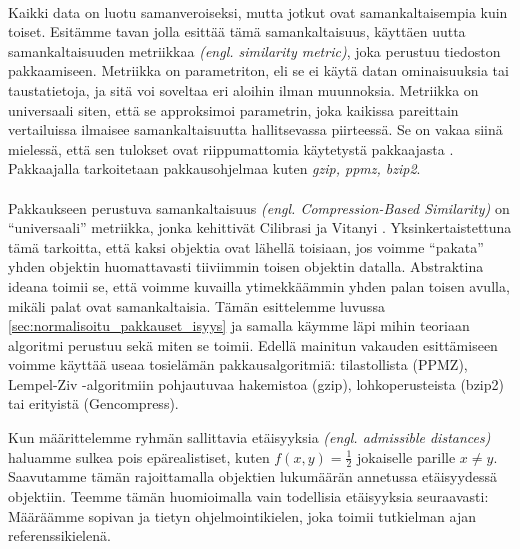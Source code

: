 \documentclass[11pt,finnish]{tktltiki2}
\theoremstyle{definition}
\theoremstyle{remark}
\newcommand{\engl}[1]{\emph{(engl. #1)}}
\begin{document}
\paragraph{} %
\label{par:intro-1}
  Kaikki data on luotu samanveroiseksi, mutta jotkut ovat samankaltaisempia kuin toiset.
  Esitämme tavan jolla esittää tämä samankaltaisuus, käyttäen uutta samankaltaisuuden metriikkaa \engl{similarity metric}, joka perustuu tiedoston pakkaamiseen. Metriikka on parametriton, eli se ei käytä datan ominaisuuksia tai taustatietoja, ja sitä voi soveltaa eri aloihin ilman muunnoksia.
  Metriikka on universaali siten, että se approksimoi parametrin, joka kaikissa pareittain vertailuissa ilmaisee samankaltaisuutta hallitsevassa piirteessä. Se on vakaa siinä mielessä, että sen tulokset ovat riippumattomia käytetystä pakkaajasta \cite{CV05}. Pakkaajalla tarkoitetaan pakkausohjelmaa kuten \emph{gzip, ppmz, bzip2}.


\paragraph{} %
\label{par:intro-2}
   Pakkaukseen perustuva samankaltaisuus \engl{Compression-Based Similarity} on ``universaali'' metriikka, jonka kehittivät Cilibrasi ja Vitanyi \cite{CV05}. Yksinkertaistettuna tämä tarkoitta, että kaksi objektia ovat lähellä toisiaan, jos voimme ``pakata'' yhden objektin huomattavasti tiiviimmin toisen objektin datalla. Abstraktina ideana toimii se, että voimme kuvailla ytimekkäämmin yhden palan toisen avulla, mikäli palat ovat samankaltaisia. Tämän esittelemme luvussa \ref{sec:normalisoitu_pakkauset_isyys} ja samalla käymme läpi mihin teoriaan algoritmi perustuu sekä miten se toimii. Edellä mainitun vakauden esittämiseen voimme käyttää useaa tosielämän pakkausalgoritmiä: tilastollista (PPMZ), Lempel-Ziv -algoritmiin pohjautuvaa hakemistoa (gzip), lohkoperusteista (bzip2) tai erityistä (Gencompress).

   Kun määrittelemme ryhmän sallittavia etäisyyksia \engl{admissible distances} haluamme sulkea pois epärealistiset, kuten $f(x,y) = \frac{1}{2}$ jokaiselle parille $x \neq y$. Saavutamme tämän rajoittamalla objektien lukumäärän annetussa etäisyydessä objektiin. Teemme tämän huomioimalla vain todellisia etäisyyksia seuraavasti: Määräämme sopivan ja tietyn ohjelmointikielen, joka toimii tutkielman ajan referenssikielenä. \cite{CV05}

\end{document}

